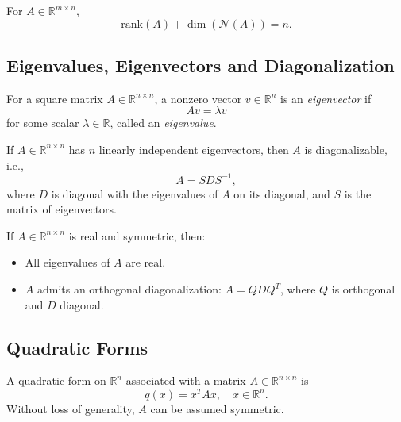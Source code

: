 \begin{theorem}
For $A \in \mathbb{R}^{m \times n}$,  
\begin{equation}
\mathrm{rank}(A) + \dim(\mathcal{N}(A)) = n.
\end{equation}
\end{theorem}

\subsection{Eigenvalues, Eigenvectors and Diagonalization}

\begin{definition}
For a square matrix $A \in \mathbb{R}^{n \times n}$, a nonzero vector $v \in \mathbb{R}^n$ is an \emph{eigenvector} if 
\[
Av = \lambda v
\]
for some scalar $\lambda \in \mathbb{R}$, called an \emph{eigenvalue}.
\end{definition}

\begin{theorem}[Diagonalization]
If $A \in \mathbb{R}^{n \times n}$ has $n$ linearly independent eigenvectors, then $A$ is diagonalizable, i.e.,
\begin{equation}
A = S D S^{-1},
\end{equation}
where $D$ is diagonal with the eigenvalues of $A$ on its diagonal, and $S$ is the matrix of eigenvectors.
\end{theorem}

\begin{theorem}
If $A \in \mathbb{R}^{n \times n}$ is real and symmetric, then:
\begin{itemize}
    \item All eigenvalues of $A$ are real.
    \item $A$ admits an orthogonal diagonalization: $A = Q D Q^T$, where $Q$ is orthogonal and $D$ diagonal.
\end{itemize}
\end{theorem}

\subsection{Quadratic Forms}

A quadratic form on $\mathbb{R}^n$ associated with a matrix $A \in \mathbb{R}^{n \times n}$ is
\begin{equation}
q(x) = x^T A x, \quad x \in \mathbb{R}^n.
\end{equation}
Without loss of generality, $A$ can be assumed symmetric.

